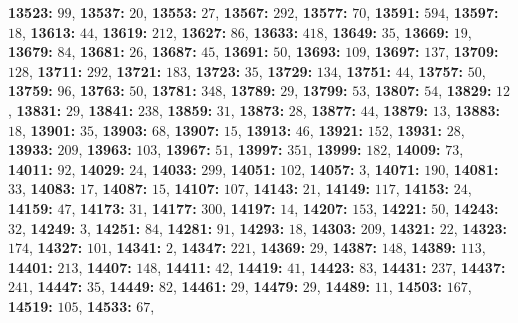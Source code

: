 \textsf{\bfseries 13523:} $99$, \textsf{\bfseries 13537:} $20$, \textsf{\bfseries 13553:} $27$, \textsf{\bfseries 13567:} $292$, \textsf{\bfseries 13577:} $70$, \textsf{\bfseries 13591:} $594$, \textsf{\bfseries 13597:} $18$, \textsf{\bfseries 13613:} $44$, \textsf{\bfseries 13619:} $212$, \textsf{\bfseries 13627:} $86$, \textsf{\bfseries 13633:} $418$, \textsf{\bfseries 13649:} $35$, \textsf{\bfseries 13669:} $19$, \textsf{\bfseries 13679:} $84$, \textsf{\bfseries 13681:} $26$, \textsf{\bfseries 13687:} $45$, \textsf{\bfseries 13691:} $50$, \textsf{\bfseries 13693:} $109$, \textsf{\bfseries 13697:} $137$, \textsf{\bfseries 13709:} $128$, \textsf{\bfseries 13711:} $292$, \textsf{\bfseries 13721:} $183$, \textsf{\bfseries 13723:} $35$, \textsf{\bfseries 13729:} $134$, \textsf{\bfseries 13751:} $44$, \textsf{\bfseries 13757:} $50$, \textsf{\bfseries 13759:} $96$, \textsf{\bfseries 13763:} $50$, \textsf{\bfseries 13781:} $348$, \textsf{\bfseries 13789:} $29$, \textsf{\bfseries 13799:} $53$, \textsf{\bfseries 13807:} $54$, \textsf{\bfseries 13829:} $12$, \textsf{\bfseries 13831:} $29$, \textsf{\bfseries 13841:} $238$, \textsf{\bfseries 13859:} $31$, \textsf{\bfseries 13873:} $28$, \textsf{\bfseries 13877:} $44$, \textsf{\bfseries 13879:} $13$, \textsf{\bfseries 13883:} $18$, \textsf{\bfseries 13901:} $35$, \textsf{\bfseries 13903:} $68$, \textsf{\bfseries 13907:} $15$, \textsf{\bfseries 13913:} $46$, \textsf{\bfseries 13921:} $152$, \textsf{\bfseries 13931:} $28$, \textsf{\bfseries 13933:} $209$, \textsf{\bfseries 13963:} $103$, \textsf{\bfseries 13967:} $51$, \textsf{\bfseries 13997:} $351$, \textsf{\bfseries 13999:} $182$, \textsf{\bfseries 14009:} $73$, \textsf{\bfseries 14011:} $92$, \textsf{\bfseries 14029:} $24$, \textsf{\bfseries 14033:} $299$, \textsf{\bfseries 14051:} $102$, \textsf{\bfseries 14057:} $3$, \textsf{\bfseries 14071:} $190$, \textsf{\bfseries 14081:} $33$, \textsf{\bfseries 14083:} $17$, \textsf{\bfseries 14087:} $15$, \textsf{\bfseries 14107:} $107$, \textsf{\bfseries 14143:} $21$, \textsf{\bfseries 14149:} $117$, \textsf{\bfseries 14153:} $24$, \textsf{\bfseries 14159:} $47$, \textsf{\bfseries 14173:} $31$, \textsf{\bfseries 14177:} $300$, \textsf{\bfseries 14197:} $14$, \textsf{\bfseries 14207:} $153$, \textsf{\bfseries 14221:} $50$, \textsf{\bfseries 14243:} $32$, \textsf{\bfseries 14249:} $3$, \textsf{\bfseries 14251:} $84$, \textsf{\bfseries 14281:} $91$, \textsf{\bfseries 14293:} $18$, \textsf{\bfseries 14303:} $209$, \textsf{\bfseries 14321:} $22$, \textsf{\bfseries 14323:} $174$, \textsf{\bfseries 14327:} $101$, \textsf{\bfseries 14341:} $2$, \textsf{\bfseries 14347:} $221$, \textsf{\bfseries 14369:} $29$, \textsf{\bfseries 14387:} $148$, \textsf{\bfseries 14389:} $113$, \textsf{\bfseries 14401:} $213$, \textsf{\bfseries 14407:} $148$, \textsf{\bfseries 14411:} $42$, \textsf{\bfseries 14419:} $41$, \textsf{\bfseries 14423:} $83$, \textsf{\bfseries 14431:} $237$, \textsf{\bfseries 14437:} $241$, \textsf{\bfseries 14447:} $35$, \textsf{\bfseries 14449:} $82$, \textsf{\bfseries 14461:} $29$, \textsf{\bfseries 14479:} $29$, \textsf{\bfseries 14489:} $11$, \textsf{\bfseries 14503:} $167$, \textsf{\bfseries 14519:} $105$, \textsf{\bfseries 14533:} $67$, 
